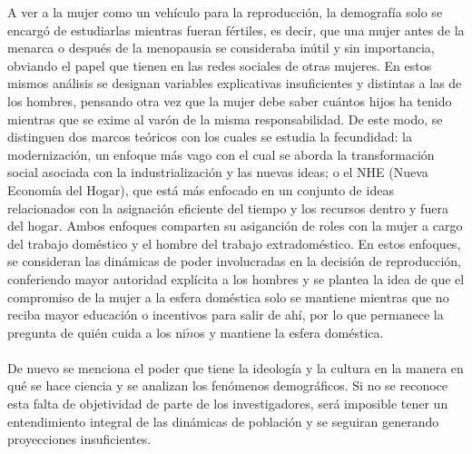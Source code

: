 \documentclass[11pt,spanish,letterpaper]{article}
\theoremstyle{plain}
\begin{document}
A ver a la mujer como un veh\'iculo para la reproducci\'on, la demograf\'ia solo se encarg\'o de estudiarlas mientras fueran f\'ertiles, es decir, que una mujer antes de la menarca o despu\'es de la menopausia se consideraba in\'util y sin importancia, obviando el papel que tienen en las redes sociales de otras mujeres. En estos mismos an\'alisis se designan variables explicativas insuficientes y distintas a las de los hombres, pensando otra vez que la mujer debe saber cu\'antos hijos ha tenido mientras que se exime al var\'on de la misma responsabilidad. De este modo, se distinguen dos marcos te\'oricos con los cuales se estudia la fecundidad: la modernizaci\'on, un enfoque m\'as vago con el cual se aborda la transformaci\'on social asociada con la industrializaci\'on y las nuevas ideas; o el NHE (Nueva Econom\'ia del Hogar), que est\'a m\'as enfocado en un conjunto de ideas relacionados con la asignaci\'on eficiente del tiempo y los recursos dentro y fuera del hogar. Ambos enfoques comparten su asiganci\'on de roles con la mujer a cargo del trabajo dom\'estico y el hombre del trabajo extradom\'estico. En estos enfoques, se consideran las din\'amicas de poder involucradas en la decisi\'on de reproducci\'on, conferiendo mayor autoridad expl\'icita a los hombres y se plantea la idea de que el compromiso de la mujer a la esfera dom\'estica solo se mantiene mientras que no reciba mayor educaci\'on o incentivos para salir de ah\'i, por lo que permanece la pregunta de qui\'en cuida a los ni$\tilde{n}$os y mantiene la esfera dom\'estica.\\
\\
De nuevo se menciona el poder que tiene la ideolog\'ia y la cultura en la manera en qu\'e se hace ciencia y se analizan los fen\'omenos demogr\'aficos. Si no se reconoce esta falta de objetividad de parte de los investigadores, ser\'a imposible tener un entendimiento integral de las din\'amicas de poblaci\'on y se seguiran generando proyecciones insuficientes. 


\end{document}
